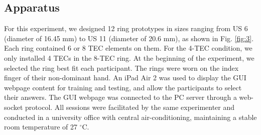 \documentclass[preprint,12pt]{elsarticle}
\begin{document}
\subsection{Apparatus}
For this experiment, we designed 12 ring prototypes in sizes ranging from US 6 (diameter of 16.45 mm) to US 11 (diameter of 20.6 mm), as shown in Fig. \ref{fig:3}. Each ring contained 6 or 8 TEC elements on them. For the 4-TEC condition, we only installed 4 TECs in the 8-TEC ring. At the beginning of the experiment, we selected the ring best fit each participant. The rings were worn on the index finger of their non-dominant hand. An iPad Air 2 was used to display the GUI webpage content for training and testing, and allow the participants to select their answers. The GUI webpage was connected to the PC server through a web-socket protocol. All sessions were facilitated by the same experimenter and conducted in a university office with central air-conditioning, maintaining a stable room temperature of 27 $^{\circ}$C.
\end{document}
